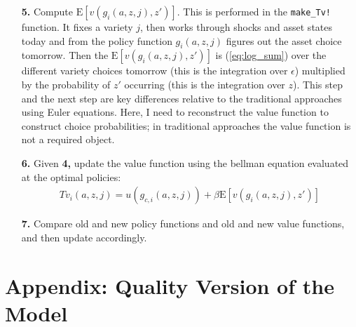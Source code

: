 \documentclass[12pt,pdftex]{article}
\begin{document}
\begin{onehalfspacing}
\begin{itemize}
\item[\textbf{5.}] Compute $\mathrm{E}\left[ v(g_{i}(a,z,j), z') \right]$. This is performed in the {\tt{make\_Tv!}} function. It fixes a variety $j$, then works through shocks and asset states today and from the policy function $g_{i}(a,z,j)$ figures out the asset choice tomorrow. Then the $\mathrm{E}\left[ v(g_{i}(a,z,j), z') \right]$ is (\ref{eq:log_sum}) over the different variety choices tomorrow (this is the integration over $\epsilon$) multiplied by the probability of $z'$ occurring (this is the integration over $z$). This step and the next step are key differences relative to the traditional approaches using Euler equations. Here, I need to reconstruct the value function to construct choice probabilities; in traditional approaches the value function is not a required object.

\item[\textbf{6.}] Given \textbf{4,} update the value function using the bellman equation evaluated at the optimal policies:
\begin{align}
Tv_{i}(a, z, j) = u(g_{c,i}(a,z,j)) + \beta \mathrm{E}\left[ v(g_{i}(a , z, j), z') \right]
\end{align}

\item[\textbf{7.}] Compare old and new policy functions and old and new value functions, and then update accordingly.
\end{itemize}

\section{Appendix: Quality Version of the Model}\label{apx-sec:quality}


\end{onehalfspacing}
\end{document}

